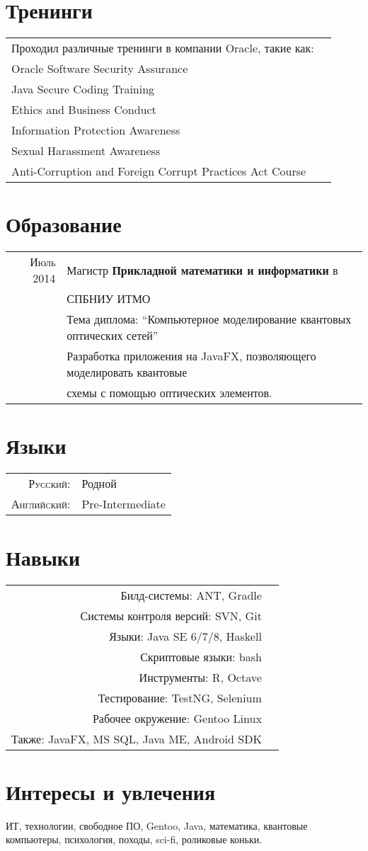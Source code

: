 \documentclass[a4paper,10pt]{article}
\begin{document}
\section{Тренинги}
	\begin{tabular}{ll}
		Проходил различные тренинги в компании Oracle, такие как: \\
		\hspace{20pt}Oracle Software Security Assurance \\
		\hspace{20pt}Java Secure Coding Training \\
		\hspace{20pt}Ethics and Business Conduct \\
		\hspace{20pt}Information Protection Awareness \\ 
		\hspace{20pt}Sexual Harassment Awareness \\
		\hspace{20pt}Anti-Corruption and Foreign Corrupt Practices Act Course
	\end{tabular}		

\section{Образование}
	\begin{tabular}{rl}	
	  \textsc{Июль 2014} & Магистр \textbf{Прикладной математики и информатики} в \\& \textsc{СПБНИУ ИТМО}\\
			& Тема диплома: ``Компьютерное моделирование квантовых оптических сетей''\\&
			Разработка приложения на JavaFX, позволяющего моделировать квантовые\\& схемы с помощью оптических элементов.
	\end{tabular}

\section{Языки}
	\begin{tabular}{rl}
		\textsc{Русский:}&Родной\\
		\textsc{Английский:}&Pre-Intermediate\\
	\end{tabular}

\section{Навыки}
	\begin{tabular}{rl}
		Билд-системы: ANT, Gradle \\
		Системы контроля версий: SVN, Git \\
		Языки: Java SE 6/7/8, Haskell \\
		Скриптовые языки: bash \\ 
		Инструменты: R, Octave \\
		Тестирование: TestNG, Selenium \\
		Рабочее окружение: Gentoo Linux \\
		Также: JavaFX, MS SQL, Java ME, Android SDK
	\end{tabular}

\section{Интересы и увлечения}
	ИТ, технологии, свободное ПО, Gentoo, Java, математика, квантовые компьютеры,
	психология, походы, sci-fi, роликовые коньки. 
\end{document}
